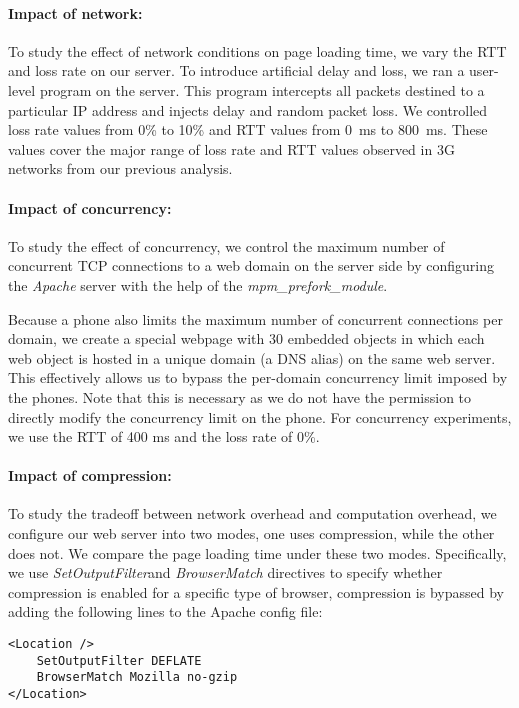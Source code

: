 \paragraph{Impact of network:} To study the effect of network
conditions on page loading time, we vary the RTT and loss rate 
on our server. To introduce artificial delay and loss, we ran a user-level program 
on the server. This program intercepts all packets destined to a 
particular IP address and injects delay and random packet loss. We 
controlled loss rate values from 0\% to 10\% and RTT values from 0~ms 
to 800~ms. These values cover the major range of loss rate and RTT 
values observed in 3G networks from our previous analysis. 

\paragraph{Impact of concurrency:} To study the effect of 
concurrency, we control the maximum number of concurrent TCP 
connections to a web domain on the server side by configuring the 
\emph{Apache} server with the help of the {\em mpm\_prefork\_module}.

Because a phone also limits the maximum number of concurrent connections per domain, we create a special webpage with 30 embedded objects in which each web object is hosted in a unique domain (a DNS alias) on the same web server. This effectively allows us to bypass the per-domain concurrency limit imposed by the phones. Note that this is necessary as we do not have the permission to directly modify the concurrency limit on the phone. For concurrency experiments, we use the RTT of 400 ms and the loss rate of 0\%. 

\paragraph{Impact of compression:} To study the tradeoff between 
network overhead and computation overhead, we configure our web
server into two modes, one uses compression, while the other does 
not. We compare the page loading time under these two modes.
Specifically, we use {\em SetOutputFilter}and {\em BrowserMatch} directives to specify whether compression is enabled for a specific type of browser, \ie compression is bypassed  by adding the following lines to the Apache config file:

\begin{lstlisting}
<Location />
	SetOutputFilter DEFLATE
	BrowserMatch Mozilla no-gzip
</Location>
\end{lstlisting}


